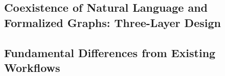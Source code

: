 
\subsection{Coexistence of Natural Language and Formalized Graphs: Three-Layer Design}
\label{sec:pipe-coexistence}




\subsection{Fundamental Differences from Existing Workflows}
\label{sec:pipe-comparison}

